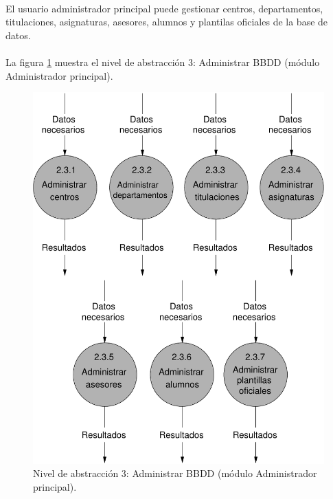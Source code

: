 \paragraph{}El usuario administrador principal puede gestionar centros,
departamentos, titulaciones, asignaturas, asesores, alumnos y plantilas
oficiales de la base de datos.

\paragraph{}La figura \ref{diagramaNivel3-AdministrarBBDD-adminPrincipal}
muestra el nivel de abstracción 3: Administrar BBDD (módulo Administrador
principal).

  \begin{figure}[!ht]
    \begin{center}
      \includegraphics[]{08.Analisis_Funcional/8.2.DFDs/Niveles/Nivel3/AdministradorPrincipal/AdministrarBBDD/Diagramas/nivel3-AdministrarBBDD.pdf}
      \caption{Nivel de abstracción 3: Administrar BBDD (módulo Administrador
      principal).}
      \label{diagramaNivel3-AdministrarBBDD-adminPrincipal}
    \end{center}
  \end{figure}

